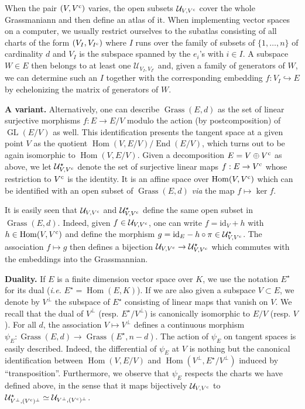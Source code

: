 \documentclass{sig-alternate}
\DeclareMathOperator{\Hom}{Hom}
\DeclareMathOperator{\End}{End}
\DeclareMathOperator{\GL}{GL}
\DeclareMathOperator{\Grass}{Grass}
\newcommand{\id}{\textrm{id}}
\renewcommand{\c}{\text{\rm c}}
\begin{document}
When the pair $(V, V^\c)$ varies, the open subsets $\mathcal 
U_{V,V^\c}$ cover the whole Grassmaniann and then define an atlas 
of it. When implementing vector spaces on a computer, we usually restrict 
ourselves to the subatlas consisting of all charts of the form $(V_I, 
V_{I^\c})$ where $I$ runs over the family of subsets of $\{1, 
\ldots, n\}$ of cardinality $d$ and $V_I$ is the subspace spanned by 
the $e_i$'s with $i \in I$. A subspace $W \in E$ then belongs to at 
least one $\mathcal U_{V_I, V_{I^{\text{c}}}}$ and, given a family of
generators of $W$, we can determine such an $I$ together with the
corresponding embedding $f : V_I \hookrightarrow E$ by echelonizing 
the matrix of generators of $W$.

\smallskip

\noindent
{\bf A variant.}
Alternatively, one can describe $\Grass(E,d)$ as the set of linear 
surjective morphisms $f : E \to E/V$ modulo the action (by 
postcomposition) of $\GL(E/V)$ as well. This identification presents the 
tangent space at a given point $V$ as the quotient $\Hom(V, E/V) / 
\End(E/V)$, which turns out to be again isomorphic to $\Hom(V, E/V)$. 
Given a decomposition $E = V \oplus V^\c$ as above, we let $\mathcal 
U^\star_{V, V^\c}$ denote the set of surjective linear maps $f : E 
\to V^\c$ whose restriction to $V^\c$ is the identity. It is an 
affine space over $\Hom(V, V^\c)$ which can be identified with an open
subset of $\Grass(E,d)$ \emph{via} the map $f \mapsto \ker f$.

It is easily seen that $\mathcal U_{V, V^\c}$ and $\mathcal 
U^\star_{V, V^\c}$ define the same open subset in $\Grass(E,d)$. 
Indeed, given $f \in \mathcal U_{V, V^\c}$, one can write $f = \id_V 
+ h$ with $h \in \Hom(V, V^\c)$ and define the morphism $g = \id_E -
h \circ \pi \in \mathcal U^\star_{V, V^\c}$. The association $f \mapsto
g$ then defines a bijection $\mathcal U_{V, V^\c} \to \mathcal
U^\star_{V, V^\c}$ which commutes with the embeddings into the
Grassmannian.

\smallskip

\noindent
{\bf Duality.}
If $E$ is a finite dimension vector space over $K$, we use the notation 
$E^\star$ for its dual (\emph{i.e.} $E^\star = \Hom(E,K)$). If we are also given
a subspace $V \subset E$, we denote by $V^\perp$ the subspace 
of $E^\star$ consisting of linear maps that vanish on $V$. We recall
that the dual of $V^\perp$ (resp. $E^\star/V^\perp$) is canonically
isomorphic to $E/V$ (resp. $V$).
For all $d$, the association $V \mapsto V^\perp$ defines a continuous 
morphism $\psi_E : \Grass(E,d) \to \Grass(E^\star, n-d)$. The action of 
$\psi_E$ on tangent spaces is easily described. Indeed, the differential 
of $\psi_E$ at $V$ is nothing but the canonical identification between
$\Hom(V, E/V)$ and $\Hom(V^\perp, E^\star/V^\perp)$ induced by 
``transposition''. Furthermore, we observe that $\psi_E$ respects
the charts we have defined above, in the sense that it maps bijectively 
$\mathcal U_{V, V^\c}$ to $\mathcal U^\star_{V^\perp, (V^\c)^\perp}
\simeq \mathcal U_{V^\perp, (V^\c)^\perp}$.
\end{document}
